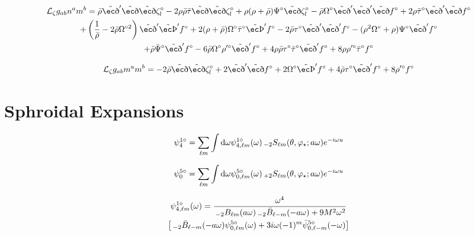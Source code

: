 \begin{multline}
\mathcal{L}_\zeta g_{ab} n^a m^b = \bar{\rho} \tilde{\eth}' \tilde{\eth} \tilde{\eth} \zeta^\circ_l - 2 \rho \bar{\rho} \bar{\tau} \tilde{\eth} \tilde{\eth} \zeta^\circ_l + \rho (\rho + \bar{\rho}) \Psi^\circ \tilde{\eth} \zeta^\circ_l - \bar{\rho} \Omega^\circ \tilde{\eth}' \tilde{\eth}' \tilde{\eth} f^\circ + 2 \rho \bar{\tau}^\circ \tilde{\eth}' \tilde{\eth} f^\circ\\
+ \left(\frac{1}{\bar{\rho}} - 2 \bar{\rho} \Omega^{\circ 2} \right) \tilde{\eth}' \tilde{\thorn}' f^\circ + 2 (\rho + \bar{\rho}) \Omega^\circ \bar{\tau}^\circ \tilde{\thorn}' f^\circ - 2 \bar{\rho} \tau^\circ \tilde{\eth}' \tilde{\eth}' f^\circ - (\rho^2 \Omega^\circ + \rho) \Psi^\circ \tilde{\eth}' f^\circ\\
+ \bar{\rho} \bar{\Psi}^\circ \tilde{\eth}' f^\circ - 6 \bar{\rho} \Omega^\circ \rho^{\prime \circ} \tilde{\eth}' f^\circ + 4 \rho \bar{\rho} \tau^\circ \bar{\tau}^\circ \tilde{\eth}' f^\circ + 8 \rho \rho^{\prime \circ} \bar{\tau}^\circ f^\circ
\end{multline}

\begin{equation}
\mathcal{L}_\zeta g_{ab} m^a m^b = - 2 \bar{\rho} \tilde{\eth} \tilde{\eth} \zeta^\circ_l + 2 \tilde{\eth}' \tilde{\eth} f^\circ + 2 \Omega^\circ \tilde{\thorn}' f^\circ + 4 \bar{\rho} \tau^\circ \tilde{\eth}' f^\circ + 8 \rho^{\prime \circ} f^\circ
\end{equation}

\section{Sphroidal Expansions}

\begin{equation}
\psi^{1 \circ}_4 = \sum_{\ell m} \int \textrm{d} \omega \psi^{1 \circ}_{4, \ell m}(\omega) \,{}_{-2}S_{\ell m} (\theta, \varphi_\star ; a \omega) e^{-i \omega u}
\end{equation}

\begin{equation}
\psi^{5 \circ}_0 = \sum_{\ell m} \int \textrm{d} \omega \psi^{5 \circ}_{0, \ell m}(\omega) \,{}_{+2}S_{\ell m} (\theta, \varphi_\star ; a \omega) e^{-i \omega u}
\end{equation}

\begin{multline}
\psi^{1 \circ}_{4, \ell m}(\omega) = \frac{\omega^4}{\,{}_{-2}B_{\ell m}(a \omega) \,{}_{-2}\bar{B}_{\ell -m}(-a \omega) + 9 M^2 \omega^2}\\
\left[ \,{}_{-2}\bar{B}_{\ell -m}(-a \omega) \psi^{5 \circ}_{0, \ell m}(\omega) + 3 i \omega (-1)^m \bar{\psi}^{5 \circ}_{0, \ell -m}(-\omega) \right]
\end{multline}

